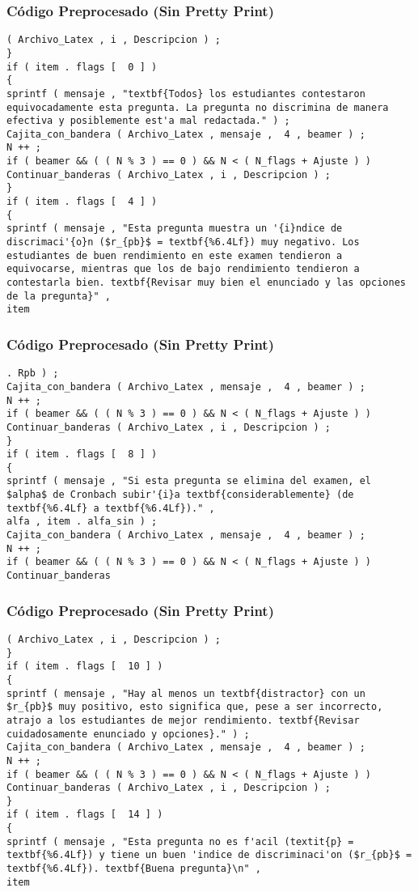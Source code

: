 \documentclass{beamer}
\begin{document}
\begin{frame}[fragile]
\frametitle{C\'odigo Preprocesado (Sin Pretty Print)}
\begin{lstlisting}[style=CStyle]
( Archivo_Latex , i , Descripcion ) ; 
} 
if ( item . flags [  0 ] ) 
{ 
sprintf ( mensaje , "textbf{Todos} los estudiantes contestaron equivocadamente esta pregunta. La pregunta no discrimina de manera efectiva y posiblemente est'a mal redactada." ) ; 
Cajita_con_bandera ( Archivo_Latex , mensaje ,  4 , beamer ) ; 
N ++ ; 
if ( beamer && ( ( N % 3 ) == 0 ) && N < ( N_flags + Ajuste ) ) 
Continuar_banderas ( Archivo_Latex , i , Descripcion ) ; 
} 
if ( item . flags [  4 ] ) 
{ 
sprintf ( mensaje , "Esta pregunta muestra un '{i}ndice de discrimaci'{o}n ($r_{pb}$ = textbf{%6.4Lf}) muy negativo. Los estudiantes de buen rendimiento en este examen tendieron a equivocarse, mientras que los de bajo rendimiento tendieron a contestarla bien. textbf{Revisar muy bien el enunciado y las opciones de la pregunta}" , 
item \end{lstlisting}
\end{frame}
\begin{frame}[fragile]
\frametitle{C\'odigo Preprocesado (Sin Pretty Print)}
\begin{lstlisting}[style=CStyle]
. Rpb ) ; 
Cajita_con_bandera ( Archivo_Latex , mensaje ,  4 , beamer ) ; 
N ++ ; 
if ( beamer && ( ( N % 3 ) == 0 ) && N < ( N_flags + Ajuste ) ) 
Continuar_banderas ( Archivo_Latex , i , Descripcion ) ; 
} 
if ( item . flags [  8 ] ) 
{ 
sprintf ( mensaje , "Si esta pregunta se elimina del examen, el $alpha$ de Cronbach subir'{i}a textbf{considerablemente} (de textbf{%6.4Lf} a textbf{%6.4Lf})." , 
alfa , item . alfa_sin ) ; 
Cajita_con_bandera ( Archivo_Latex , mensaje ,  4 , beamer ) ; 
N ++ ; 
if ( beamer && ( ( N % 3 ) == 0 ) && N < ( N_flags + Ajuste ) ) 
Continuar_banderas \end{lstlisting}
\end{frame}
\begin{frame}[fragile]
\frametitle{C\'odigo Preprocesado (Sin Pretty Print)}
\begin{lstlisting}[style=CStyle]
( Archivo_Latex , i , Descripcion ) ; 
} 
if ( item . flags [  10 ] ) 
{ 
sprintf ( mensaje , "Hay al menos un textbf{distractor} con un $r_{pb}$ muy positivo, esto significa que, pese a ser incorrecto, atrajo a los estudiantes de mejor rendimiento. textbf{Revisar cuidadosamente enunciado y opciones}." ) ; 
Cajita_con_bandera ( Archivo_Latex , mensaje ,  4 , beamer ) ; 
N ++ ; 
if ( beamer && ( ( N % 3 ) == 0 ) && N < ( N_flags + Ajuste ) ) 
Continuar_banderas ( Archivo_Latex , i , Descripcion ) ; 
} 
if ( item . flags [  14 ] ) 
{ 
sprintf ( mensaje , "Esta pregunta no es f'acil (textit{p} = textbf{%6.4Lf}) y tiene un buen 'indice de discriminaci'on ($r_{pb}$ = textbf{%6.4Lf}). textbf{Buena pregunta}\n" , 
item \end{lstlisting}
\end{frame}
\end{document}
